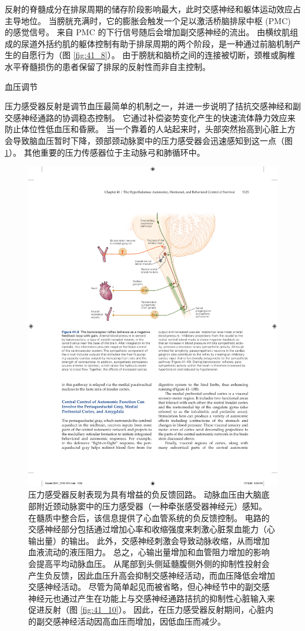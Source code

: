 反射的脊髓成分在排尿周期的储存阶段影响最大，此时交感神经和躯体运动效应占主导地位。 当膀胱充满时，它的膨胀会触发一个足以激活桥脑排尿中枢 (PMC) 的感觉信号。 来自 PMC 的下行信号随后会增加副交感神经的流出。 由横纹肌组成的尿道外括约肌的躯体控制有助于排尿周期的两个阶段，是一种通过前脑机制产生的自愿行为（图 \ref{fig:41_8}）。 由于膀胱和脑桥之间的连接被切断，颈椎或胸椎水平脊髓损伤的患者保留了排尿的反射性而非自主控制。

血压调节

压力感受器反射是调节血压最简单的机制之一，并进一步说明了拮抗交感神经和副交感神经通路的协调稳态控制。 它通过补偿姿势变化产生的快速流体静力效应来防止体位性低血压和昏厥。 
当一个靠着的人站起来时，头部突然抬高到心脏上方会导致脑血压暂时下降，颈部颈动脉窦中的压力感受器会迅速感知到这一点（图 \ref{fig:41_9}）。 
其他重要的压力传感器位于主动脉弓和肺循环中。

\begin{figure}[htbp]
	\centering
	\includegraphics[width=0.7\linewidth]{chap41/fig_41_9}
	\caption{压力感受器反射表现为具有增益的负反馈回路。 动脉血压由大脑底部附近颈动脉窦中的压力感受器（一种牵张感受器神经元）感知。 在髓质中整合后，该信息提供了心血管系统的负反馈控制。 电路的交感神经部分包括通过增加心率和收缩强度来刺激心脏泵血能力（心输出量）的输出。 此外，交感神经刺激会导致动脉收缩，从而增加血液流动的液压阻力。 总之，心输出量增加和血管阻力增加的影响会提高平均动脉血压。 从尾部到头侧延髓腹侧外侧的抑制性投射会产生负反馈，因此血压升高会抑制交感神经活动，而血压降低会增加交感神经活动。 尽管为简单起见而被省略，但心神经节中的副交感神经元也通过产生在功能上与交感神经通路拮抗的抑制性心脏输入来促进反射（图 \ref{fig:41_10}）。 因此，在压力感受器反射期间，心脏内的副交感神经活动因高血压而增加，因低血压而减少。}
	\label{fig:41_9}
\end{figure}

